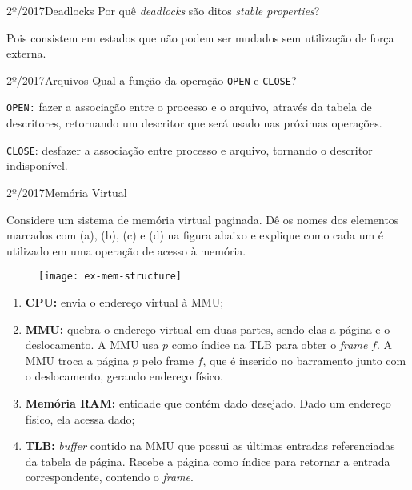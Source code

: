 \begin{exercicio}
  {2º/2017}{Deadlocks}
  {Por quê \textit{deadlocks} são ditos \textit{stable properties}?}

  Pois consistem em estados que não podem ser mudados sem utilização de força externa.
\end{exercicio}

\begin{exercicio}
  {2º/2017}{Arquivos}
  {Qual a função da operação \texttt{OPEN} e \texttt{CLOSE}?}

  \texttt{OPEN:} fazer a associação entre o processo e o arquivo, através da tabela de descritores, retornando um descritor que será usado nas próximas operações.

  \texttt{CLOSE}: desfazer a associação entre processo e arquivo, tornando o descritor indisponível.
\end{exercicio}

\begin{exercicio}
  {2º/2017}{Memória Virtual}
  {
    Considere um sistema de memória virtual paginada. Dê os nomes dos elementos marcados com (a), (b), (c) e (d) na figura abaixo e explique como cada um é utilizado em uma operação de acesso à memória.
    \begin{figure}[H]
      \centering
      \texttt{[image: ex-mem-structure]}
    \end{figure}
  }

  \begin{enumerate}[label=(\alph*)]
    \item \textbf{CPU:} envia o endereço virtual à MMU;

    \item \textbf{MMU:} quebra o endereço virtual em duas partes, sendo elas a página e o deslocamento. A MMU usa $p$ como índice na TLB para obter o \textit{frame} $f$. A MMU troca a página $p$ pelo frame $f$, que é inserido no barramento junto com o deslocamento, gerando endereço físico.

    \item \textbf{Memória RAM:} entidade que contém dado desejado. Dado um endereço físico, ela acessa dado;

    \item \textbf{TLB:} \textit{buffer} contido na MMU que possui as últimas entradas referenciadas da tabela de página. Recebe a página como índice para retornar a entrada correspondente, contendo o \textit{frame}.
  \end{enumerate}
\end{exercicio}


